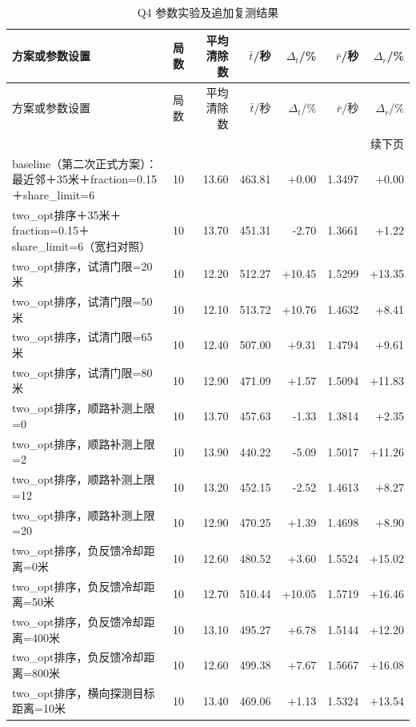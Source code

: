 \begingroup\small\setlength{\tabcolsep}{3pt}
\begin{longtable}{p{}rrrrrr}
\caption{Q4 参数实验及追加复测结果}\label{tab:official-q4-4}\\
\toprule
方案或参数设置 & 局数 & 平均清除数 & $\bar t$/秒 & $\Delta_t$/\% & $\bar r$/秒 & $\Delta_r$/\% \\
\midrule\endfirsthead
\toprule
方案或参数设置 & 局数 & 平均清除数 & $\bar t$/秒 & $\Delta_t$/\% & $\bar r$/秒 & $\Delta_r$/\% \\
\midrule\endhead
\midrule\multicolumn{7}{r}{续下页}\\\endfoot
\bottomrule\endlastfoot
baseline（第二次正式方案）：最近邻＋35米＋fraction=0.15＋share\_limit=6 & 10 & 13.60 & 463.81 & +0.00 & 1.3497 & +0.00 \\
two\_opt排序＋35米＋fraction=0.15＋share\_limit=6（宽扫对照） & 10 & 13.70 & 451.31 & -2.70 & 1.3661 & +1.22 \\
two\_opt排序，试清门限=20米 & 10 & 12.20 & 512.27 & +10.45 & 1.5299 & +13.35 \\
two\_opt排序，试清门限=50米 & 10 & 12.10 & 513.72 & +10.76 & 1.4632 & +8.41 \\
two\_opt排序，试清门限=65米 & 10 & 12.40 & 507.00 & +9.31 & 1.4794 & +9.61 \\
two\_opt排序，试清门限=80米 & 10 & 12.90 & 471.09 & +1.57 & 1.5094 & +11.83 \\
two\_opt排序，顺路补测上限=0 & 10 & 13.70 & 457.63 & -1.33 & 1.3814 & +2.35 \\
two\_opt排序，顺路补测上限=2 & 10 & 13.90 & 440.22 & -5.09 & 1.5017 & +11.26 \\
two\_opt排序，顺路补测上限=12 & 10 & 13.20 & 452.15 & -2.52 & 1.4613 & +8.27 \\
two\_opt排序，顺路补测上限=20 & 10 & 12.90 & 470.25 & +1.39 & 1.4698 & +8.90 \\
two\_opt排序，负反馈冷却距离=0米 & 10 & 12.60 & 480.52 & +3.60 & 1.5524 & +15.02 \\
two\_opt排序，负反馈冷却距离=50米 & 10 & 12.70 & 510.44 & +10.05 & 1.5719 & +16.46 \\
two\_opt排序，负反馈冷却距离=400米 & 10 & 13.10 & 495.27 & +6.78 & 1.5144 & +12.20 \\
two\_opt排序，负反馈冷却距离=800米 & 10 & 12.60 & 499.38 & +7.67 & 1.5667 & +16.08 \\
two\_opt排序，横向探测目标距离=10米 & 10 & 13.40 & 469.06 & +1.13 & 1.5324 & +13.54 \\

\end{longtable}

